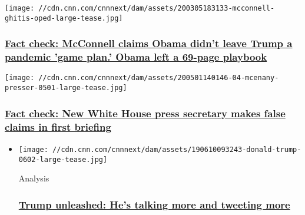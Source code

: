 \href{/2020/05/12/politics/fact-check-mcconnell-obama-trump-game-plan/index.html}{}

\texttt{[image: //cdn.cnn.com/cnnnext/dam/assets/200305183133-mcconnell-ghitis-oped-large-tease.jpg]}

\hypertarget{fact-check-mcconnell-claims-obama-didnt-leave-trump-a-pandemic-game-plan-obama-left-a-69-page-playbook}{%
\subsubsection{\texorpdfstring{\href{/2020/05/12/politics/fact-check-mcconnell-obama-trump-game-plan/index.html}{Fact
check: McConnell claims Obama didn't leave Trump a pandemic 'game plan.'
Obama left a 69-page
playbook}}{Fact check: McConnell claims Obama didn't leave Trump a pandemic 'game plan.' Obama left a 69-page playbook}}\label{fact-check-mcconnell-claims-obama-didnt-leave-trump-a-pandemic-game-plan-obama-left-a-69-page-playbook}}

\href{/2020/05/01/politics/mcenany-first-briefing-fact-check-may-1/index.html}{}

\texttt{[image: //cdn.cnn.com/cnnnext/dam/assets/200501140146-04-mcenany-presser-0501-large-tease.jpg]}

\hypertarget{fact-check-new-white-house-press-secretary-makes-false-claims-in-first-briefing}{%
\subsubsection{\texorpdfstring{\href{/2020/05/01/politics/mcenany-first-briefing-fact-check-may-1/index.html}{Fact
check: New White House press secretary makes false claims in first
briefing}}{Fact check: New White House press secretary makes false claims in first briefing}}\label{fact-check-new-white-house-press-secretary-makes-false-claims-in-first-briefing}}

\begin{itemize}
\item
  \href{https://cnn.it/31FEXHv}{}

  \texttt{[image: //cdn.cnn.com/cnnnext/dam/assets/190610093243-donald-trump-0602-large-tease.jpg]}

  Analysis

  \hypertarget{trump-unleashed-hes-talking-more-and-tweeting-more}{%
  \subsubsection{\texorpdfstring{\href{https://cnn.it/31FEXHv}{Trump
  unleashed: He's talking more and tweeting
  more}}{Trump unleashed: He's talking more and tweeting more}}\label{trump-unleashed-hes-talking-more-and-tweeting-more}}
\end{itemize}

